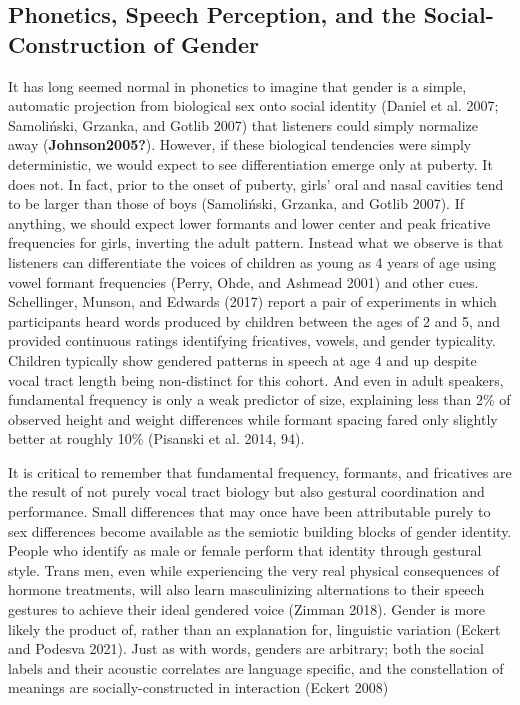 \documentclass[
  letterpaper,
  DIV=11,
  numbers=noendperiod]{scrartcl}
\begin{document}
\subsection{Phonetics, Speech Perception, and the Social-Construction of
Gender}\label{sub-gender}

It has long seemed normal in phonetics to imagine that gender is a
simple, automatic projection from biological sex onto social identity
(Daniel et al. 2007; Samoliński, Grzanka, and Gotlib 2007) that
listeners could simply normalize away (\textbf{Johnson2005?}). However,
if these biological tendencies were simply deterministic, we would
expect to see differentiation emerge only at puberty. It does not. In
fact, prior to the onset of puberty, girls' oral and nasal cavities tend
to be larger than those of boys (Samoliński, Grzanka, and Gotlib 2007).
If anything, we should expect lower formants and lower center and peak
fricative frequencies for girls, inverting the adult pattern. Instead
what we observe is that listeners can differentiate the voices of
children as young as 4 years of age using vowel formant frequencies
(Perry, Ohde, and Ashmead 2001) and other cues. Schellinger, Munson, and
Edwards (2017) report a pair of experiments in which participants heard
words produced by children between the ages of 2 and 5, and provided
continuous ratings identifying fricatives, vowels, and gender
typicality. Children typically show gendered patterns in speech at age 4
and up despite vocal tract length being non-distinct for this cohort.
And even in adult speakers, fundamental frequency is only a weak
predictor of size, explaining less than 2\% of observed height and
weight differences while formant spacing fared only slightly better at
roughly 10\% (Pisanski et al. 2014, 94).

It is critical to remember that fundamental frequency, formants, and
fricatives are the result of not purely vocal tract biology but also
gestural coordination and performance. Small differences that may once
have been attributable purely to sex differences become available as the
semiotic building blocks of gender identity. People who identify as male
or female perform that identity through gestural style. Trans men, even
while experiencing the very real physical consequences of hormone
treatments, will also learn masculinizing alternations to their speech
gestures to achieve their ideal gendered voice (Zimman 2018). Gender is
more likely the product of, rather than an explanation for, linguistic
variation (Eckert and Podesva 2021). Just as with words, genders are
arbitrary; both the social labels and their acoustic correlates are
language specific, and the constellation of meanings are
socially-constructed in interaction (Eckert 2008)
\end{document}
